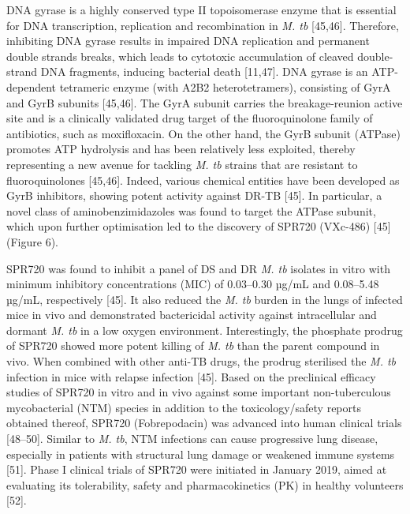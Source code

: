 \documentclass{article}
\begin{document}
DNA gyrase is a highly conserved type II topoisomerase enzyme that is essential for DNA transcription, replication and recombination in \textit{M. tb} [45,46]. Therefore, inhibiting DNA gyrase results in impaired DNA replication and permanent double strands breaks, which leads to cytotoxic accumulation of cleaved double-strand DNA fragments, inducing bacterial death [11,47]. DNA gyrase is an ATP-dependent tetrameric enzyme (with A2B2 heterotetramers), consisting of GyrA and GyrB subunits [45,46]. The GyrA subunit carries the breakage-reunion active site and is a clinically validated drug target of the fluoroquinolone family of antibiotics, such as moxifloxacin. On the other hand, the GyrB subunit (ATPase) promotes ATP hydrolysis and has been relatively less exploited, thereby representing a new avenue for tackling \textit{M. tb} strains that are resistant to fluoroquinolones [45,46]. Indeed, various chemical entities have been developed as GyrB inhibitors, showing potent activity against DR-TB [45]. In particular, a novel class of aminobenzimidazoles was found to target the ATPase subunit, which upon further optimisation led to the discovery of SPR720 (VXc-486) [45] (Figure 6).

SPR720 was found to inhibit a panel of DS and DR \textit{M. tb} isolates in vitro with minimum inhibitory concentrations (MIC) of 0.03–0.30 µg/mL and 0.08–5.48 µg/mL, respectively [45]. It also reduced the \textit{M. tb} burden in the lungs of infected mice in vivo and demonstrated bactericidal activity against intracellular and dormant \textit{M. tb} in a low oxygen environment. Interestingly, the phosphate prodrug of SPR720 showed more potent killing of \textit{M. tb} than the parent compound in vivo. When combined with other anti-TB drugs, the prodrug sterilised the \textit{M. tb} infection in mice with relapse infection [45]. Based on the preclinical efficacy studies of SPR720 in vitro and in vivo against some important non-tuberculous mycobacterial (NTM) species in addition to the toxicology/safety reports obtained thereof, SPR720 (Fobrepodacin) was advanced into human clinical trials [48–50]. Similar to \textit{M. tb}, NTM infections can cause progressive lung disease, especially in patients with structural lung damage or weakened immune systems [51]. Phase I clinical trials of SPR720 were initiated in January 2019, aimed at evaluating its tolerability, safety and pharmacokinetics (PK) in healthy volunteers [52].
\end{document}
